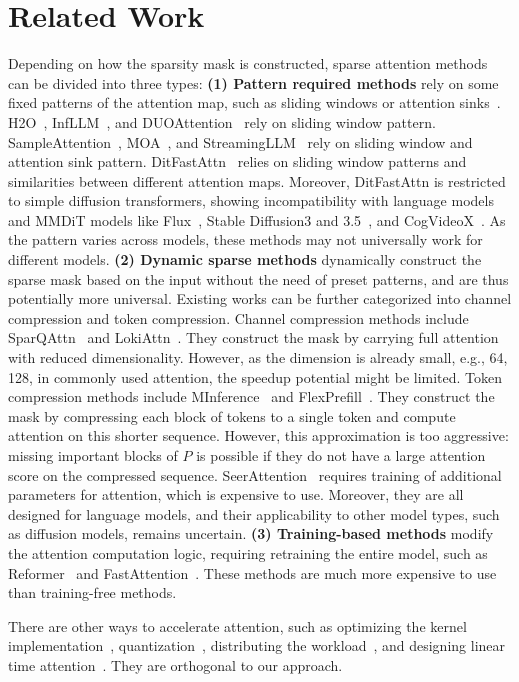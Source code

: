 
\section{Related Work}  \label{sec:related_work}


Depending on how the sparsity mask is constructed, sparse attention methods can be divided into three types:
\textbf{(1) Pattern required methods}
rely on some fixed patterns of the attention map, such as sliding windows or attention sinks~\cite{xiao2023efficient}. H2O~\cite{zhang2023h2o}, InfLLM~\cite{xiao2024infllm}, and DUOAttention~\cite{xiao2024duoattention} rely on sliding window pattern. SampleAttention~\cite{zhu2024sampleattention}, MOA~\cite{moaattention}, and StreamingLLM~\cite{xiao2023efficient} rely on sliding window and attention sink pattern. DitFastAttn~\cite{yuan2024ditfastattn} relies on sliding window patterns and similarities between different attention maps. Moreover, DitFastAttn is restricted to simple diffusion transformers, showing incompatibility with language models and MMDiT models like Flux~\cite{flux}, Stable Diffusion3 and 3.5~\cite{stable_diffusion_3_5}, and CogVideoX~\cite{yang2024cogvideox}.
As the pattern varies across models, these methods may not universally work for different models.
\textbf{(2) Dynamic sparse methods}
 dynamically construct the sparse mask based on the input without the need of preset patterns, and are thus potentially more universal. 
Existing works can be further categorized into channel compression and token compression. Channel compression methods include SparQAttn~\cite{ribar2023sparq} and LokiAttn~\cite{singhania2024loki}. They construct the mask by carrying full attention with reduced dimensionality. However, as the dimension is already small, e.g., 64, 128, in commonly used attention, the speedup potential might be limited. 
Token compression methods include MInference~\cite{jiang2407minference} and FlexPrefill~\cite{FlexPrefill}. They construct the mask by compressing each block of tokens to a single token and compute attention on this shorter sequence. However, this approximation is too aggressive: missing important blocks of $P$ is possible if they do not have a large attention score on the compressed sequence. SeerAttention~\cite{gao2024seerattention} requires training of additional parameters for attention, which is expensive to use. Moreover, they are all designed for language models, and their applicability to other model types, such as diffusion models, remains uncertain.
\textbf{(3) Training-based methods}
 modify the attention computation logic, requiring retraining the entire model, such as Reformer~\cite{kitaev2020reformer} and FastAttention~\cite{pagliardini2023fast}. These methods are much more expensive to use than training-free methods. 

There are other ways to accelerate attention, such as optimizing the kernel implementation~\cite{dao2022flashattention,dao2023flashattention,shah2024flashattention}, quantization~\cite{2024sageattention}, distributing the workload~\cite{liu2023ringattentionblockwisetransformers}, and designing linear time attention~\cite{wang2020linformer,choromanski2020rethinking,yu2022metaformer,katharopoulos2020transformers}. They are orthogonal to our approach. 
